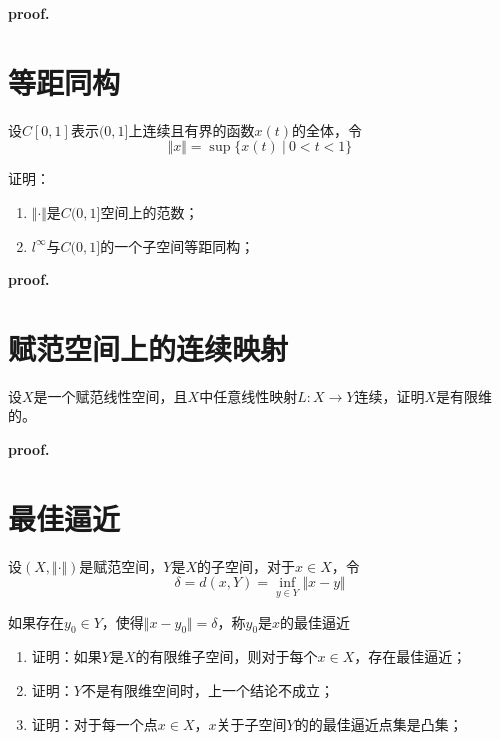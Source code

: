 \textbf{proof.}

\section{等距同构}

\begin{mdframed}
    \begin{question}
        设$C[0,1]$表示$(0,1]$上连续且有界的函数$x(t)$的全体，令
        \begin{equation}
            \Vert x\Vert=\sup\{x(t)\ |\ 0<t<1\}
        \end{equation}

        证明：
        \begin{enumerate}[itemindent=2em]
            \item $\Vert \cdot\Vert$是$C(0,1]$空间上的范数；
            \item $l^\infty$与$C(0,1]$的一个子空间等距同构；
        \end{enumerate}
    \end{question}
\end{mdframed}

\textbf{proof.}

\section{赋范空间上的连续映射}

\begin{mdframed}
    \begin{question}
        设$X$是一个赋范线性空间，且$X$中任意线性映射$L:X\rightarrow Y$连续，证明$X$是有限维的。
    \end{question}
\end{mdframed}

\textbf{proof.}

\section{最佳逼近}

\begin{mdframed}
    \begin{question}
        设$(X,\Vert\cdot\Vert)$是赋范空间，$Y$是$X$的子空间，对于$x\in X$，令
        \begin{equation}
            \delta = d(x,Y)=\inf_{y\in Y}\Vert x-y\Vert
        \end{equation}

        如果存在$y_0\in Y$，使得$\Vert x-y_0\Vert=\delta$，称$y_0$是$x$的最佳逼近
        \begin{enumerate}[itemindent=2em]
            \item 证明：如果$Y$是$X$的有限维子空间，则对于每个$x\in X$，存在最佳逼近；
            \item 证明：$Y$不是有限维空间时，上一个结论不成立；
            \item 证明：对于每一个点$x\in X$，$x$关于子空间$Y$的的最佳逼近点集是凸集；
        \end{enumerate}
    \end{question}
\end{mdframed}

